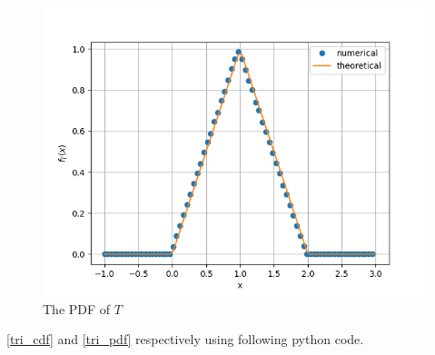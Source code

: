 \documentclass[journal,12pt,twocolumn]{IEEEtran}
\renewcommand\thesection{\arabic{section}}
\begin{document}
\begin{enumerate}[label=\thesection.\arabic*
		,ref=\thesection.\theenumi]
		\begin{figure}
			\centering
			\includegraphics[width=\columnwidth]{./ques_4/tri_pdf.png}
			\caption{The PDF of $T$}
			\label{tri_pdf}
		\end{figure}
		\eqref{tri_cdf} and \eqref{tri_pdf} respectively using following python code.
	\end{enumerate}
	
\end{document}
